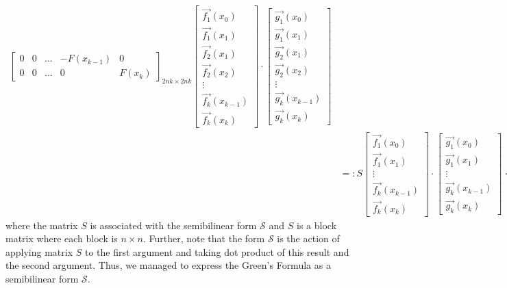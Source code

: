 \documentclass[10pt,reqno,oneside,a4paper]{article}
\begin{document}
\begin{align}
{\begin{bmatrix}
0 & 0 & \ldots & -F(x_{k-1}) & 0 \\
0 & 0 & \ldots & 0 &  F(x_{k})
\end{bmatrix}}_\text{$2nk\times 2nk$}
\begin{bmatrix}
\vec{f_1}(x_{0})  \\
\vec{f_1}(x_1) \\
\vec{f_2}(x_1)  \\
\vec{f_2}(x_2) \\
\vdots \\
\vec{f_k}(x_{k-1})  \\
\vec{f_k}(x_k)
\end{bmatrix}
\cdot 
\begin{bmatrix}
\vec{g_1}(x_{0})  \\
\vec{g_1}(x_1) \\
\vec{g_2}(x_1)  \\
\vec{g_2}(x_2) \\
\vdots \\
\vec{g_k}(x_{k-1})  \\
\vec{g_k}(x_k)
\end{bmatrix} \nonumber \\
&=: S \begin{bmatrix}
\vec{f_1}(x_{0})  \\
\vec{f_1}(x_1) \\
\vdots \\
\vec{f_k}(x_{k-1})  \\
\vec{f_k}(x_k)
\end{bmatrix} \cdot
\begin{bmatrix}
\vec{g_1}(x_{0})  \\
\vec{g_1}(x_1) \\
\vdots \\
\vec{g_k}(x_{k-1})  \\
\vec{g_k}(x_k)
\end{bmatrix} = \mathcal{S} \left( \begin{bmatrix}
\vec{f_1}(x_{0})  \\
\vec{f_1}(x_1) \\
\vdots \\
\vec{f_k}(x_{k-1})  \\
\vec{f_k}(x_k)
\end{bmatrix},  
\begin{bmatrix}
\vec{g_1}(x_{0})  \\
\vec{g_1}(x_1) \\
\vdots \\
\vec{g_k}(x_{k-1})  \\
\vec{g_k}(x_k)
\end{bmatrix}
\right), \label{P2.GR-Sform}
\end{align} 
where the matrix $S$ is associated with the semibilinear form $\mathcal{S}$ and $S$ is a block matrix where each block is $n \times n.$ Further, note that the form $\mathcal{S}$ is the action of applying matrix $S$ to the first argument and taking dot product of this result and the second argument. Thus, we managed to express the Green's Formula as a semibilinear form $\mathcal{S}.$ 
\end{document}

